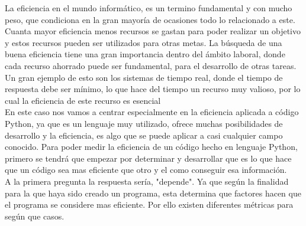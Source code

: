 
La eficiencia\cite{Eficiencia} en el mundo informático, es un termino fundamental y con mucho peso, que condiciona en la gran mayoría de ocasiones todo lo relacionado a este. Cuanta mayor eficiencia menos recursos se gastan para poder realizar un objetivo y estos recursos pueden ser utilizados para otras metas. 
La búsqueda de una buena eficiencia tiene una gran importancia dentro del ámbito laboral, donde cada recurso ahorrado puede ser fundamental, para el desarrollo de otras tareas. Un gran ejemplo de esto son los sistemas de tiempo real, donde el tiempo de respuesta debe ser mínimo, lo que hace del tiempo un recurso muy valioso, por lo cual la eficiencia de este recurso es esencial\\

En este caso nos vamos a centrar especialmente en la eficiencia aplicada a código Python, ya que es un lenguaje muy utilizado, ofrece muchas posibilidades de desarrollo y la eficiencia, es algo que se puede aplicar a casi cualquier campo conocido.
Para poder medir la eficiencia de un código hecho en lenguaje Python, primero se tendrá que empezar por determinar y desarrollar que es lo que hace que un código sea mas eficiente que otro y el como conseguir esa información.\\

A la primera pregunta la respuesta sería, "depende". Ya que según la finalidad para la que haya sido creado un programa, esta determina que factores hacen que el  programa se considere mas eficiente. Por ello existen diferentes métricas\cite{TiposEficiencia} para según que casos.\\

